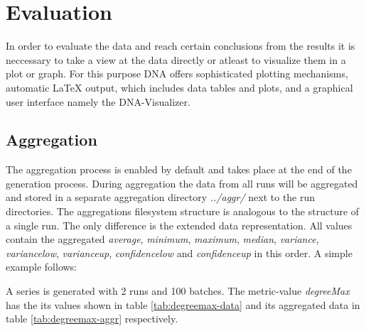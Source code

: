 \chapter{Evaluation}
In order to evaluate the data and reach certain conclusions from the results it is neccessary to take a view at the data directly or atleast to visualize them in a plot or graph. For this purpose DNA offers sophisticated plotting mechanisms, automatic LaTeX output, which includes data tables and plots, and a graphical user interface namely the DNA-Visualizer.

\section{Aggregation}
The aggregation process is enabled by default and takes place at the end of the generation process. During aggregation the data from all runs will be aggregated and stored in a separate aggregation directory \textit{../aggr/} next to the run directories. The aggregations filesystem structure is analogous to the structure of a single run. The only difference is the extended data representation. All values contain the aggregated \textit{average}, \textit{minimum}, \textit{maximum}, \textit{median}, \textit{variance}, \textit{variance\textunderscore low}, \textit{variance\textunderscore up}, \textit{confidence\textunderscore low} and \textit{confidence\textunderscore up} in this order. A simple example follows:

A series is generated with 2 runs and 100 batches. The metric-value \textit{degreeMax} has the its values shown in table \ref{tab:degreemax-data} and its aggregated data in table \ref{tab:degreemax-aggr} respectively.

